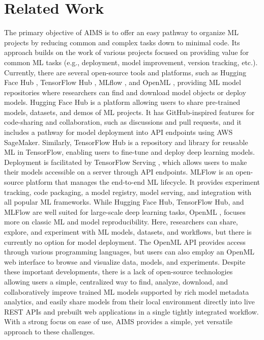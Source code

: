 \section{Related Work}
The primary objective of AIMS is to offer an easy pathway to organize ML projects by reducing common and complex tasks down to minimal code. Its approach builds on the work of various projects focused on providing value for common ML tasks (e.g., deployment, model improvement, version tracking, etc.). Currently, there are several open-source tools and platforms, such as Hugging Face Hub \citep{noauthor_hugging_2023}, TensorFlow Hub \citep{noauthor_tensorflow_2023}, MLflow \citep{chen_developments_2020, noauthor_mlflow_2023, zaharia_accelerating_2018}, and OpenML \citep{feurer_openml-python_2021, vanschoren_openml_2014, van_rijn_openml_2013}, providing ML model repositories where researchers can find and download model objects or deploy models. Hugging Face Hub \citep{noauthor_hugging_2023} is a platform allowing users to share pre-trained models, datasets, and demos of ML projects. It has GitHub-inspired features for code-sharing and collaboration, such as discussions and pull requests, and it includes a pathway for model deployment into API endpoints using AWS SageMaker. Similarly, TensorFlow Hub \citep{noauthor_tensorflow_2023} is a repository and library for reusable ML in TensorFlow, enabling users to fine-tune and deploy deep learning models. Deployment is facilitated by TensorFlow Serving \citep{olston_tensorflow-serving_2017}, which allows users to make their models accessible on a server through API endpoints. MLFlow \citep{chen_developments_2020, noauthor_mlflow_2023, zaharia_accelerating_2018} is an open-source platform that manages the end-to-end ML lifecycle. It provides experiment tracking, code packaging, a model registry, model serving, and integration with all popular ML frameworks. While Hugging Face Hub, TensorFlow Hub, and MLFlow are well suited for large-scale deep learning tasks, OpenML \citep{feurer_openml-python_2021, vanschoren_openml_2014, van_rijn_openml_2013}, focuses more on classic ML and model reproducibility. Here, researchers can share, explore, and experiment with ML models, datasets, and workflows, but there is currently no option for model deployment. The OpenML API provides access through various programming languages, but users can also employ an OpenML web interface to browse and visualize data, models, and experiments.
Despite these important developments, there is a lack of open-source technologies allowing users a simple, centralized way to find, analyze, download, and collaboratively improve trained ML models supported by rich model metadata analytics, and easily share models from their local environment directly into live REST APIs and prebuilt web applications in a single tightly integrated workflow. With a strong focus on ease of use, AIMS provides a simple, yet versatile approach to these challenges.


